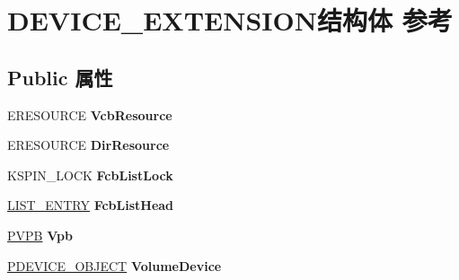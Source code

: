 \hypertarget{struct_d_e_v_i_c_e___e_x_t_e_n_s_i_o_n}{}\section{D\+E\+V\+I\+C\+E\+\_\+\+E\+X\+T\+E\+N\+S\+I\+O\+N结构体 参考}
\label{struct_d_e_v_i_c_e___e_x_t_e_n_s_i_o_n}
\subsection*{Public 属性}
\begin{DoxyCompactItemize}
\item 
\mbox{\label{struct_d_e_v_i_c_e___e_x_t_e_n_s_i_o_n_a8a47bd2cca77d559969f7176d2eede21}} 
E\+R\+E\+S\+O\+U\+R\+CE {\bfseries Vcb\+Resource}
\item 
\mbox{\label{struct_d_e_v_i_c_e___e_x_t_e_n_s_i_o_n_ae970cda4e7ad7fd4c1c3cde8ad61236a}} 
E\+R\+E\+S\+O\+U\+R\+CE {\bfseries Dir\+Resource}
\item 
\mbox{\label{struct_d_e_v_i_c_e___e_x_t_e_n_s_i_o_n_a03dbe8fbcb082f78a7e83c589d0856a8}} 
K\+S\+P\+I\+N\+\_\+\+L\+O\+CK {\bfseries Fcb\+List\+Lock}
\item 
\mbox{\label{struct_d_e_v_i_c_e___e_x_t_e_n_s_i_o_n_a9f7a4149a595f85637528c35c2129abc}} 
\hyperlink{struct___l_i_s_t___e_n_t_r_y}{L\+I\+S\+T\+\_\+\+E\+N\+T\+RY} {\bfseries Fcb\+List\+Head}
\item 
\mbox{\label{struct_d_e_v_i_c_e___e_x_t_e_n_s_i_o_n_ad8499da49dabe7e96d92e96ce81ec424}} 
\hyperlink{struct___v_p_b}{P\+V\+PB} {\bfseries Vpb}
\item 
\mbox{\label{struct_d_e_v_i_c_e___e_x_t_e_n_s_i_o_n_aa1a928d783312c76bfec3129929f21cc}} 
\hyperlink{struct___d_e_v_i_c_e___o_b_j_e_c_t}{P\+D\+E\+V\+I\+C\+E\+\_\+\+O\+B\+J\+E\+CT} {\bfseries Volume\+Device}
\item 
\mbox{\label{struct_d_e_v_i_c_e___e_x_t_e_n_s_i_o_n_a94ea162d65828471ed30b51f5d34bfd3}} 

\end{DoxyCompactItemize}
